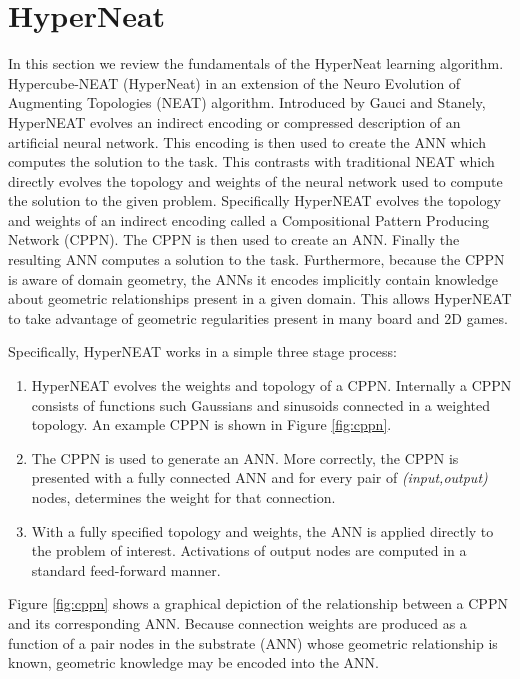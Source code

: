 \documentclass{acm_proc_article-sp}
\begin{document}
\section{HyperNeat}
\label{sec:hyperneat}
In this section we review the fundamentals of the HyperNeat learning algorithm. Hypercube-NEAT (HyperNeat) in an extension of the Neuro Evolution of Augmenting Topologies (NEAT) algorithm\cite{stanley02}. Introduced by Gauci and Stanely\cite{gauci08}, HyperNEAT evolves an indirect encoding or compressed description of an artificial neural network. This encoding is then used to create the ANN which computes the solution to the task. This contrasts with traditional NEAT which directly evolves the topology and weights of the neural network used to compute the solution to the given problem. Specifically HyperNEAT evolves the topology and weights of an indirect encoding called a Compositional Pattern Producing Network (CPPN). The CPPN is then used to create an ANN. Finally the resulting ANN computes a solution to the task. Furthermore, because the CPPN is aware of domain geometry, the ANNs it encodes implicitly contain knowledge about geometric relationships present in a given domain. This allows HyperNEAT to take advantage of geometric regularities present in many board and 2D games.

Specifically, HyperNEAT works in a simple three stage process:

\begin{enumerate}
\item HyperNEAT evolves the weights and topology of a CPPN. Internally a CPPN consists of functions such Gaussians and sinusoids connected in a weighted topology. An example CPPN is shown in Figure \ref{fig:cppn}.
\item The CPPN is used to generate an ANN. More correctly, the CPPN is presented with a fully connected ANN and for every pair of \emph{(input,output)} nodes, determines the weight for that connection.
\item With a fully specified topology and weights, the ANN is applied directly to the problem of interest. Activations of output nodes are computed in a standard feed-forward manner.
\end{enumerate}

Figure \ref{fig:cppn} shows a graphical depiction of the relationship between a CPPN and its corresponding ANN. Because connection weights are produced as a function of a pair nodes in the substrate (ANN) whose geometric relationship is known, geometric knowledge may be encoded into the ANN. 
\end{document}
